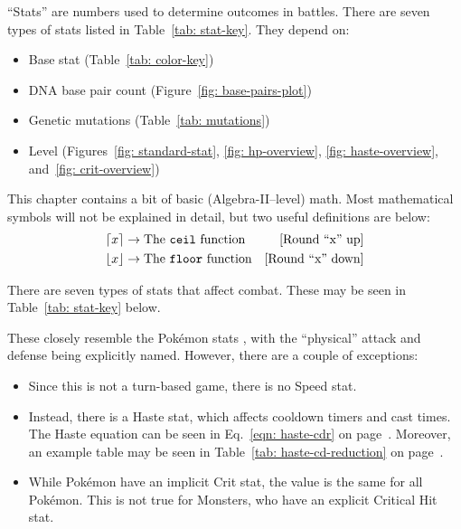 
\def\tableWidth{0.5\textwidth}

``Stats'' are numbers used to determine outcomes in battles. There are seven types of stats listed in Table~\ref{tab: stat-key}. They depend on:

\begin{itemize}
	\item{Base stat (Table~\ref{tab: color-key})}
	\item{DNA base pair count (Figure~\ref{fig: base-pairs-plot})}
	\item{Genetic mutations (Table~\ref{tab: mutations})}
	\item{Level (Figures~\ref{fig: standard-stat}, \ref{fig: hp-overview}, \ref{fig: haste-overview}, and~\ref{fig: crit-overview})}
\end{itemize}





This chapter contains a bit of basic (Algebra-II--level) math. Most mathematical symbols will not be explained in detail, but two useful definitions are below:
\begin{align*}
	\lceil x\rceil &\rightarrow \text{The \texttt{ceil} function} & \text{[Round ``x'' up]}\\
	\lfloor x\rfloor &\rightarrow \text{The \texttt{floor} function} & \text{[Round ``x'' down]}\\
\end{align*}

There are seven types of stats that affect combat. These may be seen in Table~\ref{tab: stat-key} below. 

		
\noindent These closely resemble the Pok\'{e}mon stats \cite{pkmn-stats}, with the ``physical'' attack and defense being explicitly named. However, there are a couple of exceptions:

\begin{itemize}
	\item{Since this is not a turn-based game, there is no Speed stat.}
	\item{Instead, there is a Haste stat, which affects cooldown timers and cast times. The Haste equation can be seen in Eq.~\eqref{eqn: haste-cdr} on page~\pageref{eqn: haste-cdr}. Moreover, an example table may be seen in Table~\ref{tab: haste-cd-reduction} on page~\pageref{tab: haste-cd-reduction}.}
	\item{While Pok\'{e}mon have an implicit Crit stat, the value is the same for all Pok\'{e}mon. This is not true for Monsters, who have an explicit Critical Hit stat.}
\end{itemize}

